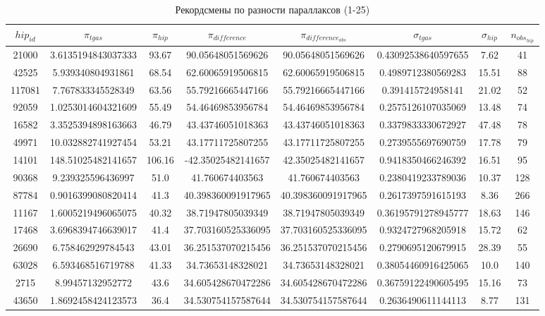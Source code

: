 \documentclass[14pt]{article} %
\begin{document}
\newpage
\begin{landscape}
\begin{spacing}{1.0}
\begin{table}[h]
\caption{Рекордсмены по разности параллаксов (1-25)}
\label{tabular:75_25}
\begin{tabular}{|c|c|c|c|c|c|c|c|}
\hline 	
$hip_{id}$ &$\pi_{tgas}$ &$\pi_{hip}$ &$\pi_{difference}$ &$\pi_{difference_{abs}}$ &$\sigma_{tgas}$ &$\sigma_{hip}$ &$n_{obs_{hip}}$\\
\hline 
21000&3.6135194843037333&93.67&90.05648051569626&90.05648051569626&0.43092538640597655&7.62&41\\
42525&5.939340804931861&68.54&62.60065919506815&62.60065919506815&0.4989712380569283&15.51&88\\
117081&7.767833345528349&63.56&55.79216665447166&55.79216665447166&0.391415724958141&21.02&52\\
92059&1.0253014604321609&55.49&54.46469853956784&54.46469853956784&0.2575126107035069&13.48&74\\
16582&3.3525394898163663&46.79&43.43746051018363&43.43746051018363&0.3379833330672927&47.48&78\\
49971&10.032882741927454&53.21&43.17711725807255&43.17711725807255&0.2739555697690759&17.78&79\\
14101&148.51025482141657&106.16&-42.35025482141657&42.35025482141657&0.9418350466246392&16.51&95\\
90368&9.239325596436997&51.0&41.760674403563&41.760674403563&0.2380419233789036&10.37&128\\
87784&0.9016399080820414&41.3&40.398360091917965&40.398360091917965&0.2617397591615193&8.36&266\\
11167&1.6005219496065075&40.32&38.71947805039349&38.71947805039349&0.36195791278945777&18.63&146\\
17468&3.6968394746639017&41.4&37.703160525336095&37.703160525336095&0.9324727968205918&15.72&62\\
26690&6.758462929784543&43.01&36.251537070215456&36.251537070215456&0.2790695120679915&28.39&55\\
63028&6.593468516719788&41.33&34.73653148328021&34.73653148328021&0.38054460916425065&10.0&140\\
2715&8.99457132952772&43.6&34.605428670472286&34.605428670472286&0.36759122490605495&15.16&73\\
43650&1.8692458424123573&36.4&34.530754157587644&34.530754157587644&0.2636490611144113&8.77&131\\

\end{tabular}
\end{table}
\end{spacing}
\end{landscape}
\end{document}
